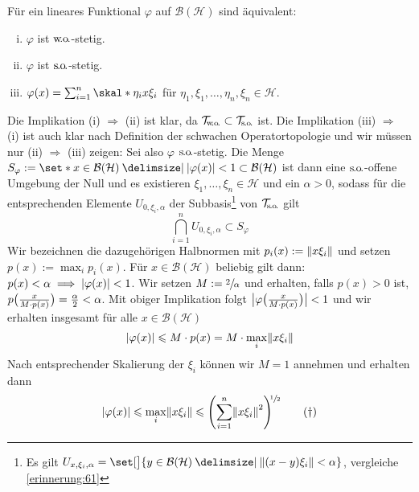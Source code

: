 \begin{satz}[label=satz:619,{name=[für Funktionale ist schwach stetig äquivalent zu stark stetig]}]
	Für ein lineares Funktional $\varphi$ auf $\mathcal{B}(\mathcal{H})$ sind äquivalent:
	\begin{enumerate}[(i),itemsep=0pt]
		\item $\varphi$ ist $\wo$-stetig.
		\item $\varphi$ ist $\so$-stetig.
		\item $\varphi(x)=\sum_{i=1}^{n} \skal*{\eta_i}{x \xi_i} $ für $\eta_1,\xi_1, \ldots , \eta_n, \xi_n \in \mathcal{H}$.
	\end{enumerate}
\end{satz}
\begin{beweis}
	Die Implikation (i) $\Rightarrow$ (ii) ist klar, da $\TWeakOp \subset \Tso$ ist.
	Die Implikation (iii) $\Rightarrow$ (i) ist auch klar nach Definition der schwachen Operatortopologie und wir müssen nur (ii) $\Rightarrow$ (iii) zeigen:
	Sei also $\varphi$ $\so$-stetig. Die Menge $S_\varphi := \set*{x \in \mathcal{B}(\mathcal{H}) \given \abs*{\varphi(x)}<1} \subset \mathcal{B}(\mathcal{H})$ ist dann eine $\so$-offene Umgebung der Null und es existieren $\xi_1, \ldots ,\xi_n \in \mathcal{H}$ und ein $\alpha>0$, sodass für die entsprechenden Elemente $U_{0,\xi_i,\alpha}$ der Subbasis\footnote{Es gilt $U_{x,\xi_i,\alpha}=\set[\big]{y \in \mathcal{B}(\mathcal{H}) \given \norm*{(x-y)\xi_i}< \alpha}$, vergleiche \autoref{erinnerung:61}} von $\Tso$ gilt
	\[
		\bigcap_{i=1}^n U_{0,\xi_i,\alpha}  \subset S_\varphi
	\]
	Wir bezeichnen die dazugehörigen Halbnormen mit $p_{i}(x) := \norm*{x \xi_i}$ und setzen $p(x) := \max_{i} p_i(x)$.
	Für $x \in \mathcal{B}(\mathcal{H})$ beliebig gilt dann: $p(x)<\alpha \implies \abs*{\varphi(x)}<1$.
	Wir setzen $M := \sfrac{2}{\alpha}$ und erhalten, falls $p(x)>0$ ist,
	\(
		p \enbrace[\big]{\frac{x}{M \cdot p(x)}} = \frac{\alpha}{2} < \alpha 
	\).
	Mit obiger Implikation folgt $\abs[\big]{\varphi \enbrace[\big]{\frac{x}{M \cdot p(x)}}} < 1$ und wir erhalten insgesamt für alle $x \in \mathcal{B}(\mathcal{H})$
	\begin{equation}
		\abs*{\varphi(x)} \le M \cdot p(x) = M \cdot \max_i \norm*{x \xi_i}
	\end{equation}
	Nach entsprechender Skalierung der $\xi_i$ können wir $M=1$ annehmen und erhalten dann
	\begin{equation}
		\abs*{\varphi(x)} \le  \max_i \norm*{x \xi_i} \le \enbrace*{\sum_{i=1}^{n} \norm*{x \xi_i}^2}^{\mkern-5mu\raisemath{-2.2pt}{\sfrac{1}{2}}} \label{eq:619}\tag{\dag}

\end{equation}
\end{beweis}
